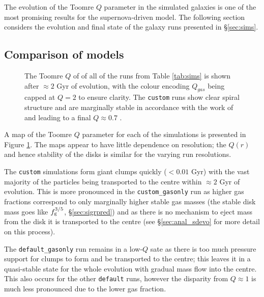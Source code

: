 The evolution of the Toomre $Q$ parameter in the simulated galaxies is one of the most promising results for the supernova-driven model.
The following section considers the evolution and final state of the galaxy runs presented in \S \ref{sec:sims}.

\subsection{Comparison of models}

\begin{figure}[!ht]
    \leavevmode\rlap{\usebox{\graphicsbox}}%
    \begin{minipage}[b]{0.63\wd\graphicsbox}%
        \caption{The Toomre $Q$ of of all of the runs from Table \ref{tab:sims} is shown after $\approx 2$ Gyr of evolution, with the colour encoding $Q_{gas}$ being capped at $Q=2$ to ensure clarity. The {\tt custom} runs show clear spiral structure and are marginally stable in accordance with the work of \citet{hopkins_stellar_2012} and \citep{behrendt_structure_2015} leading to a final $Q \approx 0.7$ .}
        \label{fig:toomqsimbigfig}
    \end{minipage}\hspace*{0.33\wd\graphicsbox}%
\end{figure}

A map of the Toomre $Q$ parameter for each of the simulations is presented in Figure \ref{fig:toomqsimbigfig}.
The maps appear to have little dependence on resolution; the $Q(r)$ and hence stability of the disks is similar for the varying run resolutions.

The {\tt custom} simulations form giant clumps quickly ($<0.01$ Gyr) with the vast majority of the particles being transported to the centre within $\approx 2$ Gyr of evolution.
This is more pronounced in the {\tt custom\_gasonly} run as higher gas fractions correspond to only marginally higher stable gas masses (the stable disk mass goes like $f_\mathrm{g}^{3/5}$, \S \ref{sec:sigrpred}) and as there is no mechanism to eject mass from the disk it is transported to the centre (see \S \ref{sec:anal_sdevo} for more detail on this process).

The {\tt default\_gasonly} run remains in a low-$Q$ sate as there is too much pressure support for clumps to form and be transported to the centre; this leaves it in a quasi-stable state for the whole evolution with gradual mass flow into the centre.
This also occurs for the other {\tt default} runs, however the disparity from $Q \approx 1$ is much less pronounced due to the lower gas fraction.

